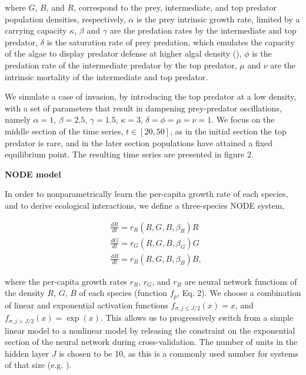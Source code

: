 \documentclass[11pt, oneside]{article}
\begin{document}
where $G$, $B$, and $R$, correspond to the prey, intermediate, and top predator population densities, respectively,
$\alpha$ is the prey intrinsic growth rate, limited by a carrying capacity $\kappa$, 
$\beta$ and $\gamma$ are the predation rates by the intermediate and top predator,
$\delta$ is the saturation rate of prey predation, which emulates the capacity of the algae to display predator defense at higher algal density (\cite{Hiltunen2013}),
$\phi$ is the predation rate of the intermediate predator by the top predator,
$\mu$ and $\nu$ are the intrinsic mortality of the intermediate and top predator.

We simulate a case of invasion, by introducing the top predator at a low density, with a set of parameters that result in dampening prey-predator oscillations, namely $\alpha = 1$, $\beta = 2.5$, $\gamma = 1.5$, $\kappa = 3$, $\delta = \phi = \mu = \nu = 1$.
We focus on the middle section of the time series, $t \in [20,50]$, as in the initial section the top predator is rare, and in the later section populations have attained a fixed equilibrium point.
The resulting time series are presented in figure 2.

\textbf{NODE model}

In order to nonparametrically learn the per-capita growth rate of each species, and to derive ecological interactions, we define a three-species NODE system,

\vspace{-0.5cm}
\begin{equation} \begin{aligned}
	& \frac{dR}{dt} = r_R(R,G,B,\beta_R) R \\
	& \frac{dG}{dt} = r_G(R,G,B,\beta_G) G \\
	& \frac{dB}{dt} = r_B(R,G,B,\beta_B) B,
\end{aligned} \end{equation}

where the per-capita growth rates $r_R$, $r_G$, and $r_B$ are neural network functions of the density $R$, $G$, $B$ of each species (function $f_p$, Eq. 2).
We choose a combination of linear and exponential activation functions $f_{\sigma, j\leq J/2}(x) = x$, and $f_{\sigma, j>J/2}(x) = \exp(x)$.
This allows us to progressively switch from a simple linear model to a nonlinear model by releasing the constraint on the exponential section of the neural network during cross-validation.
The number of units in the hidden layer $J$ is chosen to be 10, as this is a commonly used number for systems of that size (e.g. \cite{Wu2005,Bonnaffe2021a}). 
\end{document}
